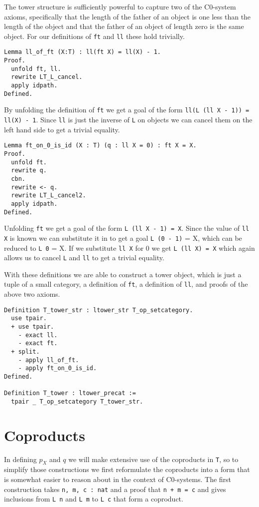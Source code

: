 The tower structure is sufficiently powerful to capture two of the C0-system
axioms, specifically that the length of the father of an object is one less than
the length of the object and that the father of an object of length zero is the
same object. For our definitions of \lstinline|ft| and \lstinline|ll| these hold
trivially.
\begin{lstlisting}
Lemma ll_of_ft (X:T) : ll(ft X) = ll(X) - 1.
Proof.
  unfold ft, ll.
  rewrite LT_L_cancel.
  apply idpath.
Defined.
\end{lstlisting}

By unfolding the definition of \lstinline|ft| we get a goal of the form
\lstinline|ll(L (ll X - 1)) = ll(X) - 1|. Since \lstinline|ll| is just the
inverse of \lstinline|L| on objects we can cancel them on the left hand side to
get a trivial equality. 

\begin{lstlisting}
Lemma ft_on_0_is_id (X : T) (q : ll X = 0) : ft X = X.
Proof.
  unfold ft.
  rewrite q.
  cbn.
  rewrite <- q.
  rewrite LT_L_cancel2.
  apply idpath.
Defined.
\end{lstlisting}

Unfolding \lstinline|ft| we get a goal of the form \lstinline|L (ll X - 1) = X|.
Since the value of \lstinline|ll X| is known we can substitute it in to get a
goal \lstinline|L (0 - 1)| = X, which can be reduced to \lstinline|L 0| = X. If
we substitute \lstinline|ll X| for 0 we get \lstinline|L (ll X) = X| which again
allows us to cancel \lstinline|L| and \lstinline|ll| to get a trivial equality.

With these definitions we are able to construct a tower object, which is just a
tuple of a small category, a definition of \lstinline|ft|, a definition of \lstinline|ll|,
and proofs of the above two axioms.
\begin{lstlisting}
Definition T_tower_str : ltower_str T_op_setcategory.
  use tpair.
  + use tpair.
    - exact ll.
    - exact ft.
  + split.
    - apply ll_of_ft.
    - apply ft_on_0_is_id.
Defined.

Definition T_tower : ltower_precat := 
  tpair _ T_op_setcategory T_tower_str.
\end{lstlisting}

\section{Coproducts}
In defining $p_X$ and $q$ we will make extensive use of the coproducts in
\lstinline|T|, so to simplify those constructions we first reformulate the
coproducts into a form that is somewhat easier to reason about in the context of
C0-systems. The first construction takes \lstinline|n, m, c : nat| and a proof
that \lstinline|n + m = c| and gives inclusions from \lstinline|L n| and
\lstinline|L m| to \lstinline|L c| that form a coproduct.


